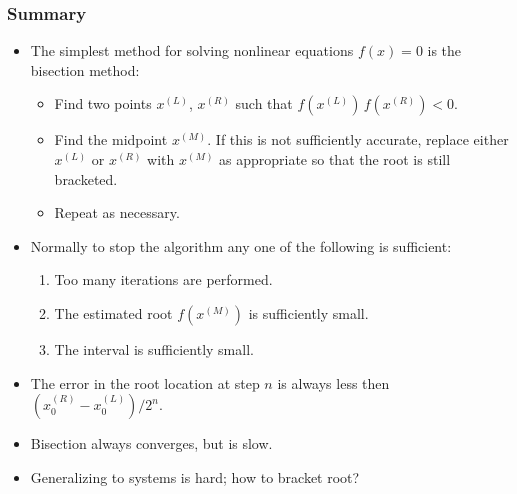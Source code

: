 \documentclass{beamer}
\begin{document}
\begin{frame}
  \frametitle{Summary}

  \begin{itemize}
  \item The simplest method for solving nonlinear equations $f(x) = 0$
    is the bisection method:
    \begin{itemize}
    \item Find two points $x^{(L)}$, $x^{(R)}$ such that $f(x^{(L)})
      \, f(x^{(R)}) < 0$.
    \item Find the midpoint $x^{(M)}$. If this is not sufficiently
      accurate, replace either $x^{(L)}$ or $x^{(R)}$ with $x^{(M)}$
      as appropriate so that the root is still bracketed.
    \item Repeat as necessary.
    \end{itemize}
  \item Normally to stop the algorithm any one of the following is sufficient:
    \begin{enumerate}
    \item Too many iterations are performed.
    \item The estimated root $f(x^{(M)})$ is sufficiently small.
    \item The interval is sufficiently small.
    \end{enumerate}
  \item The error in the root location at step $n$ is always less then
    $(x^{(R)}_0 - x^{(L)}_0) / 2^n$.
  \item Bisection always converges, but is slow.
  \item Generalizing to systems is hard; how to bracket root?
  \end{itemize}

\end{frame}
\end{document}
